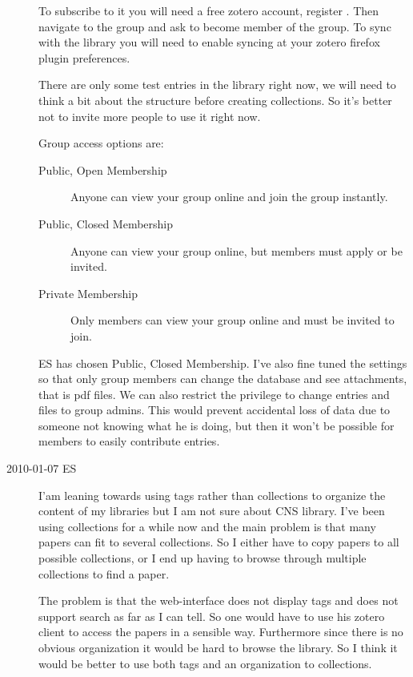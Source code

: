\begin{description}
To subscribe to it you will need a free zotero account, register
. Then navigate
to the group  and
ask to become member of the group. To sync with the library you
will need to enable syncing at your zotero firefox plugin preferences.

There are only some test entries in the library right now, we will need
to think a bit about the structure before creating collections. So it's
better not to invite more people to use it right now.

Group access options are:
\begin{description}
 \item[Public, Open Membership] Anyone can view your group online and join the group instantly.
 \item[Public, Closed Membership] Anyone can view your group online, but members must apply or be invited.
 \item[Private Membership] Only members can view your group online and must be invited to join.
\end{description}

ES has chosen Public, Closed Membership. I've also fine tuned the settings so that
only group members can change the database and see attachments, that
is pdf files. We can also restrict the privilege to change entries and files to group admins. This would
prevent accidental loss of data due to someone not knowing what he is doing, but then it won't be
possible for members to easily contribute entries.

\item[2010-01-07 ES] I'am leaning towards using tags rather than collections to organize the content
of my libraries but I am not sure about CNS library. I've been using collections for a while now
and the main problem is that many papers can fit to several collections.
So I either have to copy papers to all possible collections, or I end up having to browse
through multiple collections to find a paper.

The problem is that the web-interface does not display tags and does not support search as far as I can
tell. So one would have to use his zotero client to access the papers in a sensible way. Furthermore
since there is no obvious organization it would be hard to browse the library. So I think it would be
better to use both tags and an organization to collections.


\end{description}
